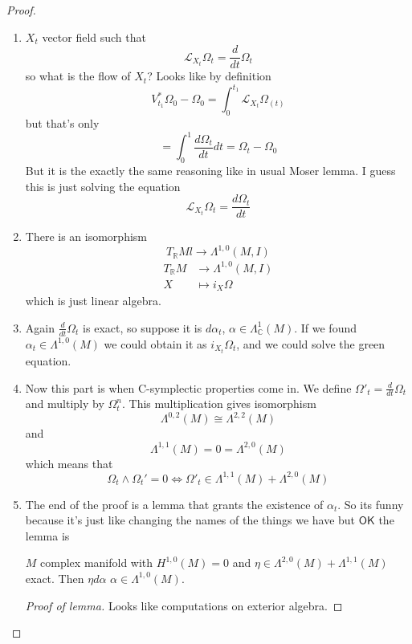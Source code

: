 \begin{proof}\leavevmode
	\begin{enumerate}[label=\textbf{Step \arabic*}]
		\item $X_t$ vector field such that
			 \[\mathcal{L}_{X_t}\Omega_t=\frac{d}{dt}\Omega_t\]
		so what is the flow of $X_t$? Looks like by definition
		 \[V_{t_1}^*\Omega_0-\Omega_0=\int_{0}^{t_1}\mathcal{L}_{X_t}\Omega_{(t)}\]
		 but that's only
		 \[=\int_{0}^1\frac{d \Omega_t}{d t}dt=\Omega_t-\Omega_0\]
		 But it is the exactly the same reasoning like in usual Moser lemma.
		 {\color{3}I guess this is just solving the equation
		 \[\mathcal{L}_{X_t}\Omega_t=\frac{d \Omega_t}{d t}\]}

		\item There is an isomorphism
			 \[T_\mathbb{R}Ml\to \Lambda^{1,0}(M,I)\]
			 \begin{align*}
			 	T_\mathbb{R}M &\longrightarrow \Lambda^{1,0}(M,I) \\
			 	X &\longmapsto i_X\Omega
			 \end{align*}
		 which is just linear algebra.

		\item Again $\frac{d}{dt}\Omega_t$ is exact, so suppose it is $d\alpha_t$, $\alpha\in\Lambda^{1}_\mathbb{C}(M)$. If we found $\alpha_t\in\Lambda^{1,0}(M)$ we could obtain it as $i_{X_t}\Omega_t$, and we could solve the {\color{3}green} equation.

		\item Now this part is when C-symplectic properties come in. We define $\Omega'_t=\frac{d}{dt}\Omega_t$ and multiply by $\Omega^n_t$. This multiplication gives isomorphism
			\[\Lambda^{0,2}(M)\cong \Lambda^{2,2}(M)\]
			and
			 \[\Lambda^{1,1}(M)=0=\Lambda^{2,0}(M)\]
			 which means that
			  \[\Omega_t\wedge \Omega_t'=0 \iff \Omega'_t\in\Lambda^{1,1}(M)+\Lambda^{2,0}(M)\]

		\item The end of the proof is a lemma that grants the existence of $\alpha_t$. So its funny because it's just like changing the names of the things we have but $\mathsf{OK}$ the lemma is 
			\begin{lemma}\leavevmode
				$M$ complex manifold with $H^{1,0}(M)=0$ and $\eta\in\Lambda^{2,0}(M)+\Lambda^{1,1}(M)$ exact. Then $\eta d\alpha$  $\alpha\in\Lambda^{1,0}(M)$.
			\end{lemma}
			\begin{proof}[Proof of lemma]\leavevmode
				Looks like computations on exterior algebra.
			\end{proof}
	\end{enumerate}
\end{proof}

